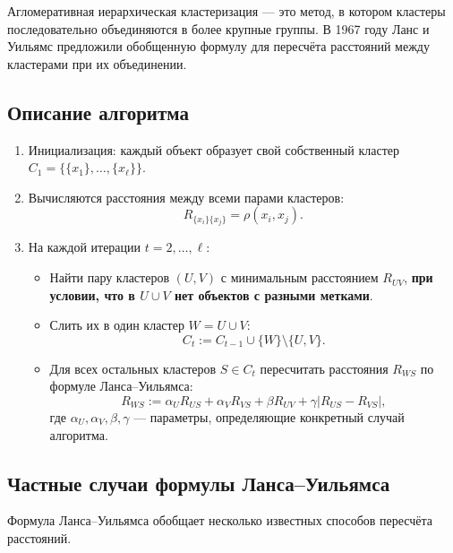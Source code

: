 Агломеративная иерархическая кластеризация — это метод, в котором кластеры последовательно объединяются в более крупные группы. В 1967 году Ланс и Уильямс предложили обобщенную формулу для пересчёта расстояний между кластерами при их объединении.

\subsection{Описание алгоритма}
\begin{enumerate}
    \item Инициализация: каждый объект образует свой собственный кластер $C_1 = \{\{x_1\}, \dots, \{x_\ell\}\}$.
    \item Вычисляются расстояния между всеми парами кластеров:
          \[
              R_{\{x_i\}\{x_j\}} = \rho(x_i, x_j).
          \]
    \item На каждой итерации $t = 2, \dots, \ell$:
          \begin{itemize}
              \item Найти пару кластеров $(U, V)$ с минимальным расстоянием $R_{UV}$, \textbf{при условии, что в $U \cup V$ нет объектов с разными метками}.
              \item Слить их в один кластер $W = U \cup V$:
                    \[
                        C_t := C_{t-1} \cup \{W\} \setminus \{U, V\}.
                    \]
              \item Для всех остальных кластеров $S \in C_t$ пересчитать расстояния $R_{WS}$ по формуле Ланса–Уильямса:
                    \[
                        R_{WS} := \alpha_U R_{US} + \alpha_V R_{VS} + \beta R_{UV} + \gamma |R_{US} - R_{VS}|,
                    \]
                    где $\alpha_U, \alpha_V, \beta, \gamma$ — параметры, определяющие конкретный случай алгоритма.
          \end{itemize}
\end{enumerate}


\subsection{Частные случаи формулы Ланса–Уильямса}
Формула Ланса–Уильямса обобщает несколько известных способов пересчёта расстояний.

